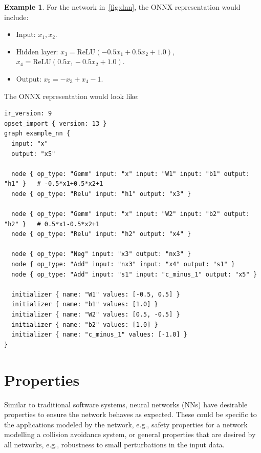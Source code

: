 \documentclass[oneside,11pt,dvipsnames]{book}
\numberwithin{equation}{section}
\theoremstyle{definition}
\newtheorem{example}{Example}[section]
\theoremstyle{remark}
\newcommand{\tvn}[1]{\iftoggle{usecomment}{{\color{red}{[TVN]: #1}}}{}}
\newcommand{\relu}[1]{\mathrm{ReLU}\left(#1\right)}
\begin{document}

\begin{example} For the network in~\autoref{fig:dnn}, the ONNX representation would include:
\begin{itemize}
    \item Input: $x_1, x_2$.
    \item Hidden layer: $x_3 = \relu{-0.5x_1 + 0.5x_2 + 1.0}$, $x_4 = \relu{0.5x_1 - 0.5x_2 + 1.0}$.
    \item Output: $x_5 = -x_3 + x_4 - 1$.
\end{itemize}
The ONNX representation would look like:

\begin{lstlisting}
ir_version: 9
opset_import { version: 13 }
graph example_nn {
  input: "x"
  output: "x5"

  node { op_type: "Gemm" input: "x" input: "W1" input: "b1" output: "h1" }   # -0.5*x1+0.5*x2+1
  node { op_type: "Relu" input: "h1" output: "x3" }

  node { op_type: "Gemm" input: "x" input: "W2" input: "b2" output: "h2" }   # 0.5*x1-0.5*x2+1
  node { op_type: "Relu" input: "h2" output: "x4" }

  node { op_type: "Neg" input: "x3" output: "nx3" }
  node { op_type: "Add" input: "nx3" input: "x4" output: "s1" }
  node { op_type: "Add" input: "s1" input: "c_minus_1" output: "x5" }

  initializer { name: "W1" values: [-0.5, 0.5] }
  initializer { name: "b1" values: [1.0] }
  initializer { name: "W2" values: [0.5, -0.5] }
  initializer { name: "b2" values: [1.0] }
  initializer { name: "c_minus_1" values: [-1.0] }
}
\end{lstlisting}
\end{example}



\chapter{Properties}\label{chap:properties}

Similar to traditional software systems, neural networks (NNs) have desirable properties to ensure the network behaves as expected. These could be specific to the applications modeled by the network, e.g., safety properties for a network modelling a collision avoidance system, or general properties that are desired by all networks, e.g., robustness to small perturbations in the input data.
\end{document}
